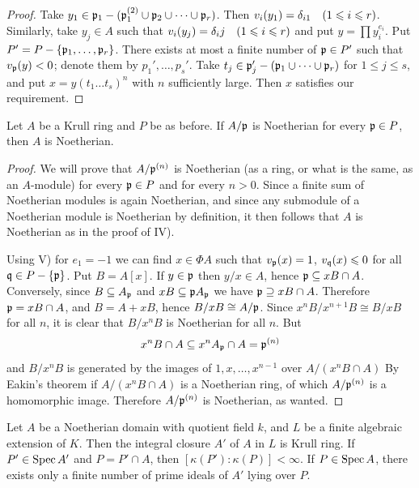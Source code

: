 \documentclass[../main]{subfiles}
\begin{document}
\begin{proof}
Take $y_1 \in \mathfrak{p}_1-(\mathfrak{p}_1^{(2)} \cup \mathfrak{p}_2 \cup \dots \cup \mathfrak{p}_r)$. Then $v_i(y_1)=\delta_{i1}\for{1 \leqslant i \leqslant r}$. Similarly, take $y_j \in A$ such that $v_i(y_j)=\delta_i j\for{1 \leqslant i \leqslant r}$ and put $y=\prod y_i^{e_i}$. Put $P'=P-\{\mathfrak{p}_1, \dots, \mathfrak{p}_r\}$. There exists at most a finite number of $\mathfrak{p} \in P'$ such that $v_{\mathfrak{p}}(y)<0$; denote them by $p_1', \ldots, p_s'$. Take $t_j \in \mathfrak{p}_j'-(\mathfrak{p}_1 \cup \dots \cup \mathfrak{p}_r)$ for $1 \leqslant j \leqslant s$, and put $x=y(t_1 \ldots t_s)^n$ with $n$ sufficiently large. Then $x$ satisfies our requirement.
\end{proof}

\begin{partheorem}\label{thm:104}
Let $A$ be a Krull ring and $P$ be as before. If $A / \mathfrak{p}$ is Noetherian for every $\mathfrak{p} \in P$, then $A$ is Noetherian.
\end{partheorem}

\begin{proof}
We will prove that $A / \mathfrak{p}^{(n)}$ is Noetherian (as a ring, or what is the same, as an $A$-module) for every $\mathfrak{p} \in P$ and for every $n>0$. Since a finite sum of Noetherian modules is again Noetherian, and since any submodule of a Noetherian module is Noetherian by definition, it then follows that $A$ is Noetherian as in the proof of IV).

Using V) for $e_1=-1$ we can find $x \in \Phi A$ such that $v_{\mathfrak{p}}(x)=1$, $v_{\mathfrak{q}}(x) \leqslant 0$ for all $\mathfrak{q} \in P-\{\mathfrak{p}\}$. Put $B=A[x]$. If $y \in \mathfrak{p}$ then $y / x \in A$, hence $\mathfrak{p} \subseteq x B \cap A$. Conversely, since $B \subseteq A_{\mathfrak{p}}$ and $x B \subseteq \mathfrak{p} A_{\mathfrak{p}}$ we have $\mathfrak{p} \supseteq x B \cap A$. Therefore $\mathfrak{p}=x B \cap A$, and $B=A+x B$, hence $B / x B \cong A / \mathfrak{p}$. Since $x^nB / x^{n+1} B \cong B / x B$ for all $n$, it is clear that $B / x^n B$ is Noetherian for all $n$. But \[x^nB \cap A \subseteq x^nA_{\mathfrak{p}} \cap A=\mathfrak{p}^{(n)}\] and $B / x^nB$ is generated by the images of $1, x, \ldots, x^{n-1}$ over $A/(x^n B \cap A)$ By Eakin's theorem if $A/(x^nB \cap A)$ is a Noetherian ring, of which $A / \mathfrak{p}^{(n)}$ is a homomorphic image. Therefore $A / \mathfrak{p}^{(n)}$ is Noetherian, as wanted.
\end{proof}

\begin{theorem*}
Let $A$ be a Noetherian domain with quotient field $k$, and $L$ be a finite algebraic extension of $K$. Then the integral closure $A'$ of $A$ in $L$ is Krull ring. If $P' \in \operatorname{Spec} A'$ and $P=P' \cap A$, then $[\kappa(P'):\kappa(P)]<\infty$. If $P \in \operatorname{Spec} A$, there exists only a finite number of prime ideals of $A'$ lying over $P$.
\end{theorem*}
\end{document}
